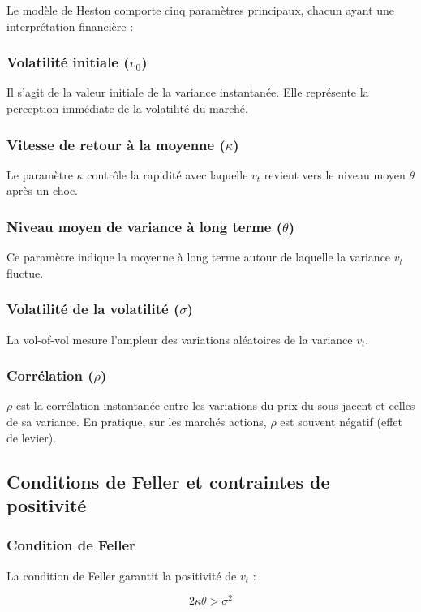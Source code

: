 Le modèle de Heston comporte cinq paramètres principaux, chacun ayant une interprétation financière :

\subsubsection{Volatilité initiale ($v_0$)}
Il s'agit de la valeur initiale de la variance instantanée. Elle représente la perception immédiate de la volatilité du marché.

\subsubsection{Vitesse de retour à la moyenne ($\kappa$)}
Le paramètre $\kappa$ contrôle la rapidité avec laquelle $v_t$ revient vers le niveau moyen $\theta$ après un choc.

\subsubsection{Niveau moyen de variance à long terme ($\theta$)}
Ce paramètre indique la moyenne à long terme autour de laquelle la variance $v_t$ fluctue.

\subsubsection{Volatilité de la volatilité ($\sigma$)}
La vol-of-vol mesure l'ampleur des variations aléatoires de la variance $v_t$.

\subsubsection{Corrélation ($\rho$)}
$\rho$ est la corrélation instantanée entre les variations du prix du sous-jacent et celles de sa variance. En pratique, sur les marchés actions, $\rho$ est souvent négatif (effet de levier).

\subsection{Conditions de Feller et contraintes de positivité}

\subsubsection{Condition de Feller}
La condition de Feller garantit la positivité de $v_t$ :

\begin{equation}
	2\kappa\theta > \sigma^2
\end{equation}

